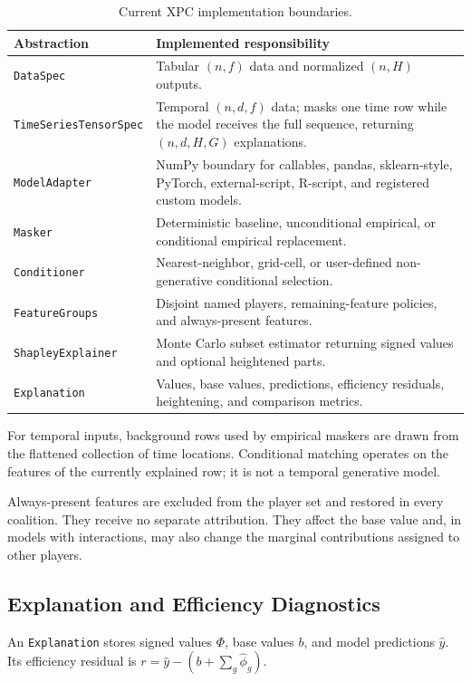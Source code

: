 \documentclass[11pt]{article}
\newcommand{\code}[1]{\texttt{#1}}
\begin{document}
\begin{table}[H]
\centering
\small
\begin{tabularx}{\textwidth}{@{}l Y@{}}
\toprule
Abstraction & Implemented responsibility \\
\midrule
\code{DataSpec} & Tabular \((n,f)\) data and normalized \((n,H)\) outputs. \\
\code{TimeSeriesTensorSpec} & Temporal \((n,d,f)\) data; masks one time row while the model receives the full sequence, returning \((n,d,H,G)\) explanations. \\
\code{ModelAdapter} & NumPy boundary for callables, pandas, sklearn-style, PyTorch, external-script, R-script, and registered custom models. \\
\code{Masker} & Deterministic baseline, unconditional empirical, or conditional empirical replacement. \\
\code{Conditioner} & Nearest-neighbor, grid-cell, or user-defined non-generative conditional selection. \\
\code{FeatureGroups} & Disjoint named players, remaining-feature policies, and always-present features. \\
\code{ShapleyExplainer} & Monte Carlo subset estimator returning signed values and optional heightened parts. \\
\code{Explanation} & Values, base values, predictions, efficiency residuals, heightening, and comparison metrics. \\
\bottomrule
\end{tabularx}
\caption{Current XPC implementation boundaries.}
\label{tab:abstractions}
\end{table}

For temporal inputs, background rows used by empirical maskers are drawn from
the flattened collection of time locations.  Conditional matching operates on
the features of the currently explained row; it is not a temporal generative
model.

Always-present features are excluded from the player set and restored in every
coalition.  They receive no separate attribution.  They affect the base value
and, in models with interactions, may also change the marginal contributions
assigned to other players.

\subsection{Explanation and Efficiency Diagnostics}

An \code{Explanation} stores signed values \(\Phi\), base values \(b\), and
model predictions \(\widehat y\).  Its efficiency residual is
\(r=\widehat y-(b+\sum_g\widehat\phi_g)\).
\end{document}
